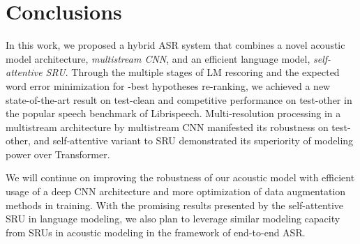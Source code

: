 \documentclass[a4paper]{article}
\begin{document}
\section{Conclusions}
In this work, we proposed a hybrid ASR system that combines a novel acoustic model architecture, \emph{multistream CNN}, and an efficient language model, \emph{self-attentive SRU}. Through the multiple stages of LM rescoring and the expected word error minimization for -best hypotheses re-ranking, we achieved a new state-of-the-art result on test-clean and competitive performance on test-other in the popular speech benchmark of Librispeech. Multi-resolution processing in a multistream architecture by multistream CNN manifested its robustness on test-other, and self-attentive variant to SRU demonstrated its superiority of modeling power over Transformer.

We will continue on improving the robustness of our acoustic model with efficient usage of a deep CNN architecture and more optimization of data augmentation methods in training. With the promising results presented by the self-attentive SRU in language modeling, we also plan to leverage similar modeling capacity from SRUs in acoustic modeling in the framework of end-to-end ASR.  









\end{document}
